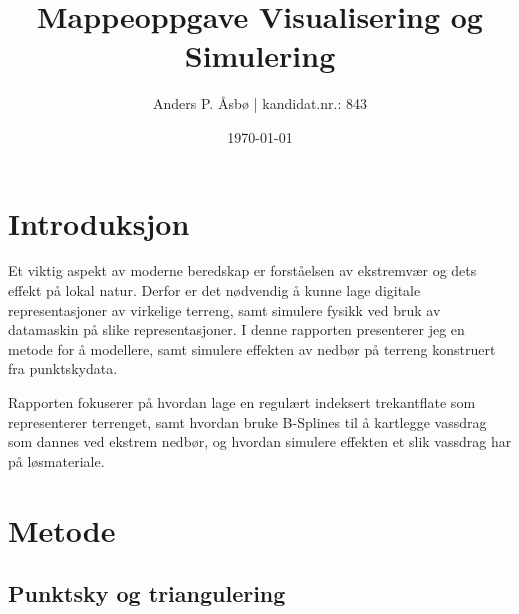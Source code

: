 \documentclass[norsk, doc, 12pt, a4paper]{apa7}  %
\title{Mappeoppgave Visualisering og Simulering}   %
\author{Anders P. Åsbø | kandidat.nr.: 843}               %
\affiliation{Høgskolen i Innlandet}
\date{\today}                             %
\begin{document}
\maketitle                                %
\tableofcontents

\section{Introduksjon}
Et viktig aspekt av moderne beredskap er forståelsen av ekstremvær og dets effekt på lokal natur. Derfor er det nødvendig å kunne lage digitale representasjoner av virkelige terreng, samt simulere fysikk ved bruk av datamaskin på slike representasjoner. I denne rapporten presenterer jeg en metode for å modellere, samt simulere effekten av nedbør på terreng konstruert fra punktskydata.

Rapporten fokuserer på hvordan lage en regulært indeksert trekantflate som representerer terrenget, samt hvordan bruke B-Splines til å kartlegge vassdrag som dannes ved ekstrem nedbør, og hvordan simulere effekten et slik vassdrag har på løsmateriale.

\section{Metode}
\subsection{Punktsky og triangulering}
\end{document}
